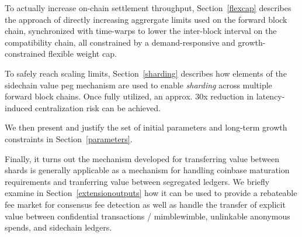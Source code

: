 To actually increase on-chain settlement throughput,
Section~\ref{flexcap} describes the approach of directly increasing
aggrergate limits used on the forward block chain, synchronized with
time-warps to lower the inter-block interval on the compatibility
chain, all constrained by a demand-responsive and growth-constrained
flexible weight cap.

To safely reach scaling limits, Section~\ref{sharding} describes how
elements of the sidechain value peg mechanism are used to enable
\emph{sharding} across multiple forward block chains.  Once fully
utilized, an approx. \num{30}x reduction in latency-induced
centralization risk can be achieved.

We then present and justify the set of initial parameters and
long-term growth constraints in Section~\ref{parameters}.

Finally, it turns out the mechanism developed for transferring value
between shards is generally applicable as a mechanism for handling
coinbase maturation requirements and tranferring value between
segregated ledgers.  We briefly examine in
Section~\ref{extensionoutputs} how it can be used to provide a
rebateable fee market for consensus fee detection as well as handle
the transfer of explicit value between confidential transactions /
mimblewimble, unlinkable anonymous spends, and sidechain ledgers.
